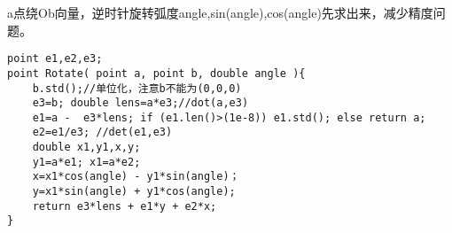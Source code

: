 a点绕Ob向量，逆时针旋转弧度angle,sin(angle),cos(angle)先求出来，减少精度问题。
\begin{lstlisting}
point e1,e2,e3;
point Rotate( point a, point b, double angle ){
	b.std();//单位化，注意b不能为(0,0,0)
	e3=b; double lens=a*e3;//dot(a,e3)
	e1=a -  e3*lens; if (e1.len()>(1e-8)) e1.std(); else return a;
	e2=e1/e3; //det(e1,e3)
	double x1,y1,x,y;	
	y1=a*e1; x1=a*e2;	
	x=x1*cos(angle) - y1*sin(angle)；
	y=x1*sin(angle) + y1*cos(angle);
	return e3*lens + e1*y + e2*x;
}
\end{lstlisting}
